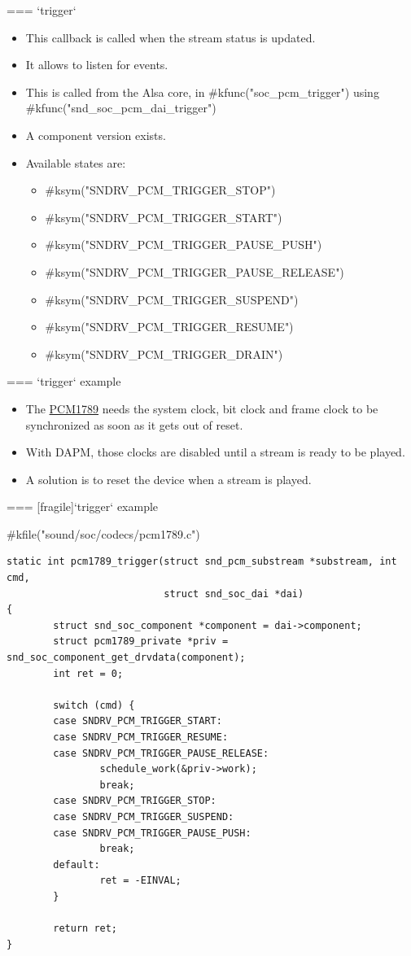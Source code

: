 === {`trigger`}
  \begin{itemize}
  \item This callback is called when the stream status is updated.
  \item It allows to listen for events.
  \item This is called from the Alsa core, in #kfunc("soc_pcm_trigger")
    using #kfunc("snd_soc_pcm_dai_trigger")
  \item A component version exists.
  \item Available states are:
    \begin{itemize}
    \item #ksym("SNDRV_PCM_TRIGGER_STOP")
    \item #ksym("SNDRV_PCM_TRIGGER_START")
    \item #ksym("SNDRV_PCM_TRIGGER_PAUSE_PUSH")
    \item #ksym("SNDRV_PCM_TRIGGER_PAUSE_RELEASE")
    \item #ksym("SNDRV_PCM_TRIGGER_SUSPEND")
    \item #ksym("SNDRV_PCM_TRIGGER_RESUME")
    \item #ksym("SNDRV_PCM_TRIGGER_DRAIN")
    \end{itemize}
  \end{itemize}


=== {`trigger` example}
  \begin{itemize}
  \item The \href{https://www.ti.com/lit/gpn/pcm1789}{PCM1789}
    needs the system clock, bit clock and frame clock
    to be synchronized as soon as it gets out of reset.
  \item With DAPM, those clocks are disabled until a stream is ready
    to be played.
  \item A solution is to reset the device when a stream is played.
  \end{itemize}


=== [fragile]{`trigger` example}
  \begin{block}{#kfile("sound/soc/codecs/pcm1789.c")}
    \fontsize{8}{8}\selectfont
    \begin{verbatim}
static int pcm1789_trigger(struct snd_pcm_substream *substream, int cmd,
                           struct snd_soc_dai *dai)
{
        struct snd_soc_component *component = dai->component;
        struct pcm1789_private *priv = snd_soc_component_get_drvdata(component);
        int ret = 0;

        switch (cmd) {
        case SNDRV_PCM_TRIGGER_START:
        case SNDRV_PCM_TRIGGER_RESUME:
        case SNDRV_PCM_TRIGGER_PAUSE_RELEASE:
                schedule_work(&priv->work);
                break;
        case SNDRV_PCM_TRIGGER_STOP:
        case SNDRV_PCM_TRIGGER_SUSPEND:
        case SNDRV_PCM_TRIGGER_PAUSE_PUSH:
                break;
        default:
                ret = -EINVAL;
        }

        return ret;
}
    \end{verbatim}
  \end{block}


